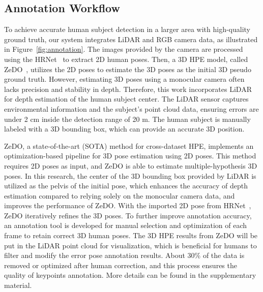 \subsection{Annotation Workflow}


To achieve accurate human subject detection in a larger area with high-quality ground truth, our system integrates LiDAR and RGB camera data, as illustrated in Figure~\ref{fig:annotation}. The images provided by the camera are processed using the HRNet~\cite{sun2019deep} to extract 2D human poses. Then, a 3D HPE model, called ZeDO~\cite{jiang2024back}, utilizes the 2D poses to estimate the 3D poses as the initial 3D pseudo ground truth. However, estimating 3D poses using a monocular camera often lacks precision and stability in depth. Therefore, this work incorporates LiDAR for depth estimation of the human subject center. The LiDAR sensor captures environmental information and the subject's point cloud data, ensuring errors are under 2 cm inside the detection range of 20 m. The human subject is manually labeled with a 3D bounding box, which can provide an accurate 3D position.

ZeDO, a state-of-the-art (SOTA) method for cross-dataset HPE, implements an optimization-based pipeline for 3D pose estimation using 2D poses. This method requires 2D poses as input, and ZeDO is able to estimate multiple-hypothesis 3D poses. In this research, the center of the 3D bounding box provided by LiDAR is utilized as the pelvis of the initial pose, which enhances the accuracy of depth estimation compared to relying solely on the monocular camera data, and improves the performance of ZeDO. With the imported 2D pose from HRNet~\cite{hrnet}, ZeDO iteratively refines the 3D poses. To further improve annotation accuracy, an annotation tool is developed for manual selection and optimization of each frame to retain correct 3D human poses. The 3D HPE results from ZeDO will be put in the LiDAR point cloud for visualization, which is beneficial for humans to filter and modify the error pose annotation results. About 30\% of the data is removed or optimized after human correction, and this process ensures the quality of keypoints annotation. More details can be found in the supplementary material.







